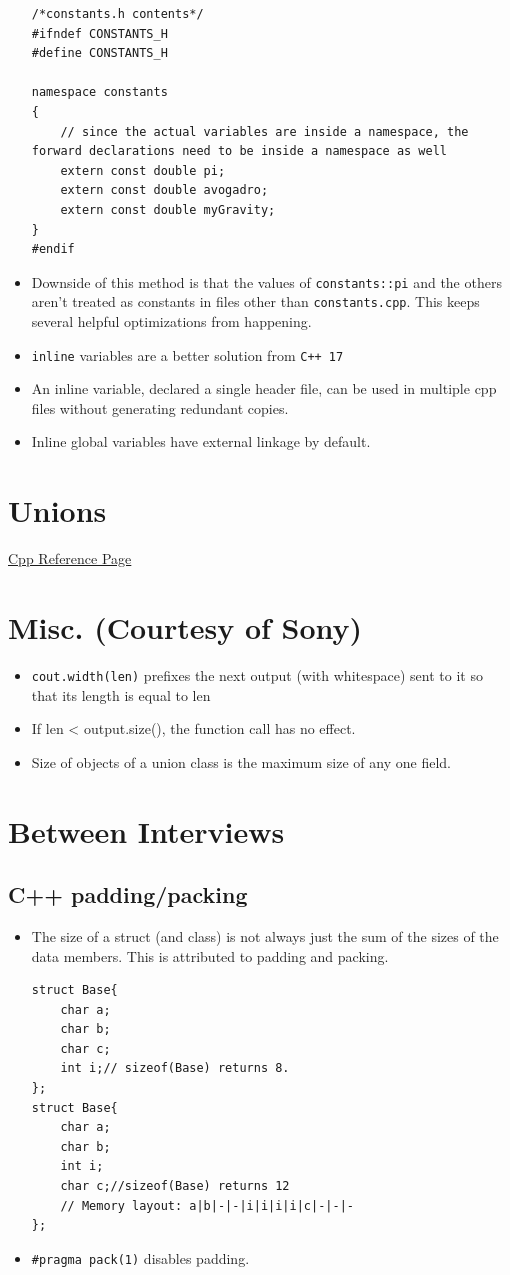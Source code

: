 \documentclass{report}
\begin{document}
\begin{itemize}
\begin{lstlisting}
/*constants.h contents*/
#ifndef CONSTANTS_H
#define CONSTANTS_H

namespace constants
{
    // since the actual variables are inside a namespace, the forward declarations need to be inside a namespace as well
    extern const double pi;
    extern const double avogadro;
    extern const double myGravity;
}
#endif
\end{lstlisting}
\item Downside of this method is that the values of \texttt{constants::pi} and the others aren't treated as constants in files other than \texttt{constants.cpp}. This keeps several helpful optimizations from happening.
\item \texttt{inline} variables are a better solution from \texttt{C++ 17}
\item An inline variable, declared a single header file, can be used in multiple cpp files without generating redundant copies.
\item Inline global variables have external linkage by default.
\end{itemize}

\section{Unions}
\href{https://en.cppreference.com/w/cpp/language/union}{Cpp Reference Page}
\section{Misc. (Courtesy of Sony)}
\begin{itemize}
\item \texttt{cout.width(len)} prefixes the next output (with whitespace) sent to it so that its length is equal to len
\item If len < output.size(), the function call has no effect.
\end{itemize}
\begin{itemize}
\item Size of objects of a union class is the maximum size of any one field.
\end{itemize}
\section{Between Interviews}
\subsection{C++ padding/packing}
\begin{itemize}
\item The size of a struct (and class) is not always just the sum of the sizes of the data members. This is attributed to padding and packing.
\begin{lstlisting}
struct Base{
    char a;
    char b;
    char c;
    int i;// sizeof(Base) returns 8.
};
struct Base{
    char a; 
    char b;
    int i;
    char c;//sizeof(Base) returns 12
    // Memory layout: a|b|-|-|i|i|i|i|c|-|-|-
};
\end{lstlisting}
\item \texttt{\#pragma pack(1)} disables padding.
\end{itemize}
\end{document}
